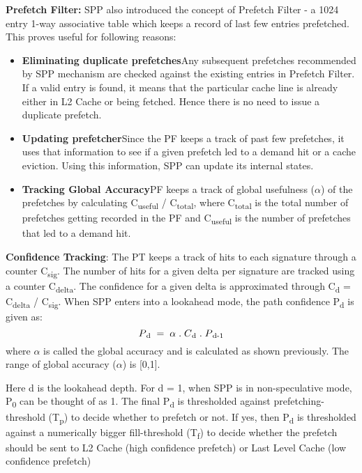 \textbf{Prefetch Filter:} SPP also introduced the concept of Prefetch
Filter - a 1024 entry 1-way associative table which keeps a record of
last few entries prefetched.  This proves useful for following
reasons:
\begin{itemize}
\item \textbf{Eliminating duplicate prefetches}\newline Any subsequent
  prefetches recommended by SPP mechanism are checked against the
  existing entries in Prefetch Filter.  If a valid entry is found, it
  means that the particular cache line is already either in L2 Cache
  or being fetched.  Hence there is no need to issue a duplicate
  prefetch.
    
\item \textbf{Updating prefetcher}\newline Since the PF keeps a track
of past few prefetches, it uses that information to see if a given
prefetch led to a demand hit or a cache eviction. Using this information, 
SPP can update its internal states.
    
\item \textbf{Tracking Global Accuracy}\newline PF keeps a track of
  global usefulness ($\alpha$) of the prefetches by calculating 
  C\textsubscript{useful} / C\textsubscript{total}, where
  C\textsubscript{total} is the total number of prefetches
  getting recorded in the PF and C\textsubscript{useful} is the number 
  of prefetches that led to a demand hit.
\end{itemize}

\textbf{Confidence Tracking}: The PT keeps a track of hits to each
signature through a counter C\textsubscript{sig}.  The number of hits
for a given delta per signature are tracked using a counter
C\textsubscript{delta}.  The confidence for a given delta is
approximated through C\textsubscript{d} = C\textsubscript{delta} /
C\textsubscript{sig}.  When SPP enters into a lookahead mode, the path
confidence P\textsubscript{d} is given as:
$$P\textsubscript{d} \;=\; \alpha  \;.\;  C\textsubscript{d}  \;.\;  P\textsubscript{d-1}$$ where $\alpha$ is called the global accuracy and is calculated as shown previously. 
The range of global accuracy ($\alpha$) is [0,1].

Here d is the lookahead depth.  For d = 1, when SPP is in
non-speculative mode, P\textsubscript{0} can be thought of as 1. 
The final P\textsubscript{d} is thresholded against prefetching-threshold
(T\textsubscript{p}) to decide whether to prefetch or not.  If yes,
then P\textsubscript{d} is thresholded against a numerically bigger
fill-threshold (T\textsubscript{f}) to decide whether the prefetch
should be sent to L2 Cache (high confidence prefetch) or Last Level
Cache (low confidence prefetch)

